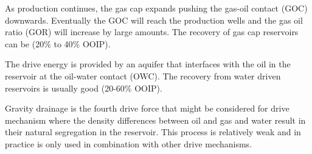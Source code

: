 \begin{description}[style=nextline]
\item[\textbf{Gas cap drive}] 
As production continues, the gas cap expands pushing the gas-oil 
contact (GOC) downwards. Eventually the GOC will reach the production wells and 
the gas oil ratio (GOR) will increase by large amounts. The recovery of gas cap 
reservoirs can be (20\% to 40\% OOIP). 
\item[\textbf{Water drive}]
The drive energy is provided by an aquifer that interfaces with the oil in the reservoir at the 
oil-water contact (OWC). The recovery from water driven reservoirs is usually good (20-60\% OOIP). 
\item[\textbf{Gravity drainage}]
Gravity drainage is the fourth drive force that might be 
considered for drive mechanism where the density differences between oil and gas 
and water result in their natural segregation in the reservoir. This process is relatively weak and in practice is only 
used in combination with other drive mechanisms. 
\end{description}
